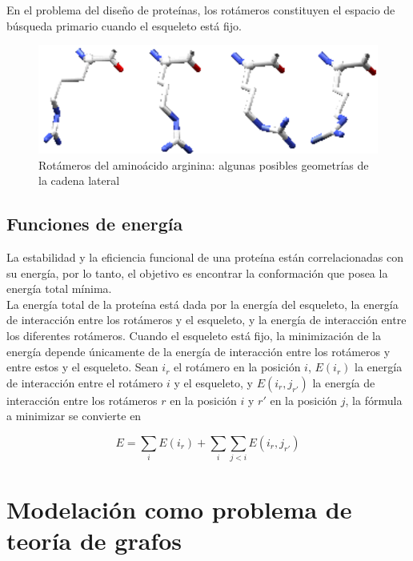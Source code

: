 \documentclass[letterpaper, 12pt]{report}
\begin{document}
En el problema del diseño de proteínas, los rotámeros constituyen el espacio de b\'usqueda primario cuando el esqueleto está fijo.


\begin{figure}
    \begin{center}
        \includegraphics[scale=0.5]{images/rotameros.png}
    \end{center}    
    \caption{Rotámeros del aminoácido arginina: algunas posibles geometr\'ias de la cadena lateral}
    \label{fig3}
\end{figure} 

\subsection{Funciones de energ\'ia}

La estabilidad y la eficiencia funcional de una proteína están correlacionadas con su energía, por lo tanto, el objetivo
es encontrar la conformación que posea la energía total mínima. \\

La energía total de la proteína está dada por la energía del esqueleto, la energía de interacción entre los rotámeros y el esqueleto,
y la energía de interacción entre los diferentes rotámeros. Cuando el esqueleto está fijo, la minimización de la energía 
depende únicamente de la energía de interacción entre los rotámeros y entre estos y el esqueleto.
Sean $i_r$ el rotámero en la posición $i$, $E(i_r)$ la energía de interacción entre el rotámero $i$ y el esqueleto, 
y $E(i_r , j_{r'})$ la energía de interacción entre los rotámeros $r$ en la posición $i$ y $r'$ en la posición $j$, la fórmula a minimizar se convierte en

\[E = \sum_i E(i_r) + \sum_i \sum_{j<i} E(i_r , j_{r'})  \]



\section{Modelaci\'on como problema de teor\'ia de grafos}
\end{document}
